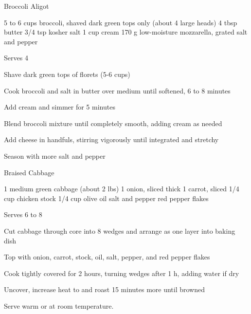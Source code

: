 \begin{recipe}{Broccoli Aligot}{\vegetarian{}}
\begin{ingredients}
5 to 6 cups broccoli, shaved dark green tops only (about 4 large heads)
4 tbsp butter
3/4 tsp kosher salt
1 cup cream
170 g low-moisture mozzarella, grated
salt and pepper
\end{ingredients}
\nextcolumn
Serves 4
\begin{steps}
    \item Shave dark green tops of florets (5-6 cups)
    \item Cook broccoli and salt in butter over medium until softened, 6 to 8 minutes
    \item Add cream and simmer for 5 minutes
    \item Blend broccoli mixture until completely smooth, adding cream as needed
    \item Add cheese in handfuls, stirring vigorously until integrated and stretchy
    \item Season with more salt and pepper
\end{steps}
\end{recipe}

\begin{recipe}{Braised Cabbage}{}
\begin{ingredients}
1 medium green cabbage (about 2 lbs)
1 onion, sliced thick
1 carrot, sliced
1/4 cup chicken stock
1/4 cup olive oil
salt and pepper
red pepper flakes
\end{ingredients}
\nextcolumn
Serves 6 to 8
\begin{steps}
    \item Cut cabbage through core into 8 wedges and arrange as one layer into baking dish
    \item Top with onion, carrot, stock, oil, salt, pepper, and red pepper flakes
    \item Cook tightly covered for 2 hours, turning wedges after 1 h, adding water if dry
    \item Uncover, increase heat to  and roast 15 minutes more until browned
\end{steps}
Serve warm or at room temperature.
\end{recipe}

